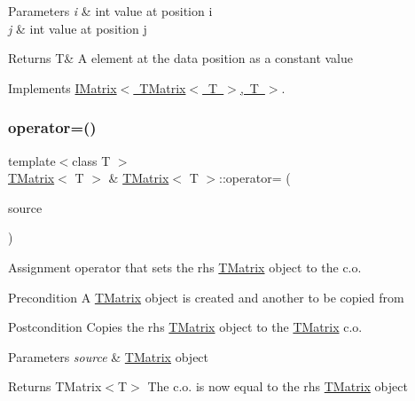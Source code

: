 \begin{DoxyParams}{Parameters}
{\em i} & int value at position i \\
\hline
{\em j} & int value at position j \\
\hline
\end{DoxyParams}
\begin{DoxyReturn}{Returns}
T\& A element at the data position as a constant value 
\end{DoxyReturn}


Implements \mbox{\hyperlink{class_i_matrix_a2abf1a0d2454051da3ccf9cacf12797e}{I\+Matrix$<$ T\+Matrix$<$ T $>$, T $>$}}.

\mbox{\label{class_t_matrix_a47aaa864a06bdc4c24608b33a353f873}} 
\subsubsection{\texorpdfstring{operator=()}{operator=()}\hspace{0.1cm}{\footnotesize\ttfamily [1/2]}}
{\footnotesize\ttfamily template$<$class T $>$ \\
\mbox{\hyperlink{class_t_matrix}{T\+Matrix}}$<$ T $>$ \& \mbox{\hyperlink{class_t_matrix}{T\+Matrix}}$<$ T $>$\+::operator= (\begin{DoxyParamCaption}\item[{const \mbox{\hyperlink{class_t_matrix}{T\+Matrix}}$<$ T $>$ \&}]{source }\end{DoxyParamCaption})\hspace{0.3cm}{\ttfamily [virtual]}}



Assignment operator that sets the rhs \mbox{\hyperlink{class_t_matrix}{T\+Matrix}} object to the c.\+o. 

\begin{DoxyPrecond}{Precondition}
A \mbox{\hyperlink{class_t_matrix}{T\+Matrix}} object is created and another to be copied from 
\end{DoxyPrecond}
\begin{DoxyPostcond}{Postcondition}
Copies the rhs \mbox{\hyperlink{class_t_matrix}{T\+Matrix}} object to the \mbox{\hyperlink{class_t_matrix}{T\+Matrix}} c.\+o. 
\end{DoxyPostcond}

\begin{DoxyParams}{Parameters}
{\em source} & \mbox{\hyperlink{class_t_matrix}{T\+Matrix}} object \\
\hline
\end{DoxyParams}
\begin{DoxyReturn}{Returns}
T\+Matrix$<$\+T$>$ The c.\+o. is now equal to the rhs \mbox{\hyperlink{class_t_matrix}{T\+Matrix}} object 
\end{DoxyReturn}


